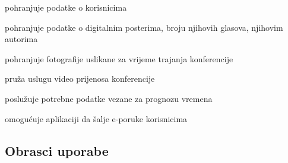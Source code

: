 \begin{packed_enum}
\begin{packed_enum}
				\end{packed_enum}
				
				\item {}
				
				\begin{packed_enum}
					
					\item pohranjuje podatke o korisnicima
					\item pohranjuje podatke o digitalnim posterima, broju njihovih glasova, njihovim autorima
					\item pohranjuje fotografije uslikane za vrijeme trajanja konferencije
					
				\end{packed_enum}
				
				\item {}
				
				\begin{packed_enum}
					
					\item pruža uslugu video prijenosa konferencije
				
				\end{packed_enum}
				
				\item {}
				
				\begin{packed_enum}
					
					\item poslužuje potrebne podatke vezane za prognozu vremena
					
				\end{packed_enum}
				
				\item {}
				
				\begin{packed_enum}
					
					\item omogućuje aplikaciji da šalje e-poruke korisnicima
					
				\end{packed_enum}
				
			\end{packed_enum}
			
			\eject 
			
			
				
			\subsection{Obrasci uporabe}
				
